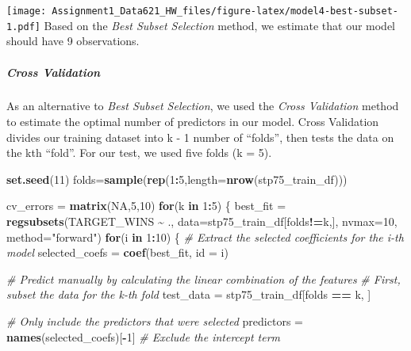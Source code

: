 \documentclass[
]{article}
\newenvironment{Shaded}{\begin{snugshade}}{\end{snugshade}}
\newcommand{\AttributeTok}[1]{\textcolor[rgb]{0.13,0.29,0.53}{#1}}
\newcommand{\CommentTok}[1]{\textcolor[rgb]{0.56,0.35,0.01}{\textit{#1}}}
\newcommand{\ConstantTok}[1]{\textcolor[rgb]{0.56,0.35,0.01}{#1}}
\newcommand{\ControlFlowTok}[1]{\textcolor[rgb]{0.13,0.29,0.53}{\textbf{#1}}}
\newcommand{\DecValTok}[1]{\textcolor[rgb]{0.00,0.00,0.81}{#1}}
\newcommand{\FunctionTok}[1]{\textcolor[rgb]{0.13,0.29,0.53}{\textbf{#1}}}
\newcommand{\NormalTok}[1]{#1}
\newcommand{\OtherTok}[1]{\textcolor[rgb]{0.56,0.35,0.01}{#1}}
\newcommand{\SpecialCharTok}[1]{\textcolor[rgb]{0.81,0.36,0.00}{\textbf{#1}}}
\newcommand{\StringTok}[1]{\textcolor[rgb]{0.31,0.60,0.02}{#1}}
\begin{document}
\texttt{[image: Assignment1\_Data621\_HW\_files/figure-latex/model4-best-subset-1.pdf]}
Based on the \emph{Best Subset Selection} method, we estimate that our
model should have 9 observations.

\subparagraph{Cross Validation}\label{cross-validation}

As an alternative to \emph{Best Subset Selection}, we used the
\emph{Cross Validation} method to estimate the optimal number of
predictors in our model. Cross Validation divides our training dataset
into k - 1 number of ``folds'', then tests the data on the kth ``fold''.
For our test, we used five folds (k = 5).

\begin{Shaded}
\begin{Highlighting}[]
\FunctionTok{set.seed}\NormalTok{(}\DecValTok{11}\NormalTok{)}
\NormalTok{folds}\OtherTok{=}\FunctionTok{sample}\NormalTok{(}\FunctionTok{rep}\NormalTok{(}\DecValTok{1}\SpecialCharTok{:}\DecValTok{5}\NormalTok{,}\AttributeTok{length=}\FunctionTok{nrow}\NormalTok{(stp75\_train\_df)))}

\NormalTok{cv\_errors }\OtherTok{=} \FunctionTok{matrix}\NormalTok{(}\ConstantTok{NA}\NormalTok{,}\DecValTok{5}\NormalTok{,}\DecValTok{10}\NormalTok{)}
\ControlFlowTok{for}\NormalTok{(k }\ControlFlowTok{in} \DecValTok{1}\SpecialCharTok{:}\DecValTok{5}\NormalTok{) \{}
\NormalTok{  best\_fit }\OtherTok{=} \FunctionTok{regsubsets}\NormalTok{(TARGET\_WINS }\SpecialCharTok{\textasciitilde{}}\NormalTok{ ., }\AttributeTok{data=}\NormalTok{stp75\_train\_df[folds}\SpecialCharTok{!=}\NormalTok{k,], }\AttributeTok{nvmax=}\DecValTok{10}\NormalTok{, }\AttributeTok{method=}\StringTok{"forward"}\NormalTok{)}
  \ControlFlowTok{for}\NormalTok{(i }\ControlFlowTok{in} \DecValTok{1}\SpecialCharTok{:}\DecValTok{10}\NormalTok{) \{}
    \CommentTok{\# Extract the selected coefficients for the i{-}th model}
\NormalTok{    selected\_coefs }\OtherTok{=} \FunctionTok{coef}\NormalTok{(best\_fit, }\AttributeTok{id =}\NormalTok{ i)}
    
    \CommentTok{\# Predict manually by calculating the linear combination of the features}
    \CommentTok{\# First, subset the data for the k{-}th fold}
\NormalTok{    test\_data }\OtherTok{=}\NormalTok{ stp75\_train\_df[folds }\SpecialCharTok{==}\NormalTok{ k, ]}
    
    \CommentTok{\# Only include the predictors that were selected}
\NormalTok{    predictors }\OtherTok{=} \FunctionTok{names}\NormalTok{(selected\_coefs)[}\SpecialCharTok{{-}}\DecValTok{1}\NormalTok{]  }\CommentTok{\# Exclude the intercept term}
    

\end{Highlighting}
\end{Shaded}
\end{document}
